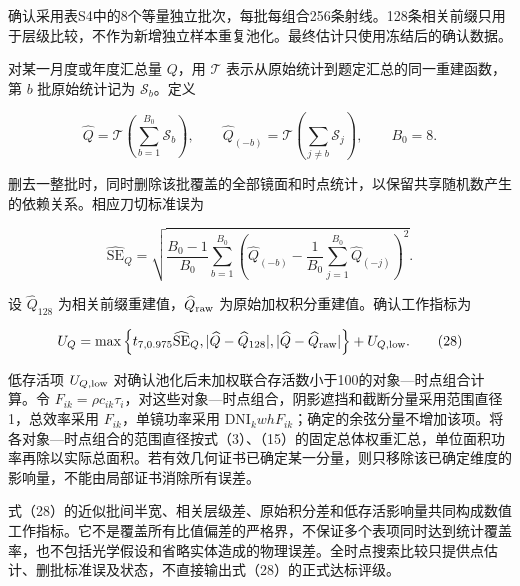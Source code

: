 \documentclass[UTF8,fontset=windows,zihao=-4]{ctexart}
\begin{document}
确认采用表S4中的8个等量独立批次，每批每组合256条射线。128条相关前缀只用于层级比较，不作为新增独立样本重复池化。最终估计只使用冻结后的确认数据。

\par\noindent\begin{minipage}{\linewidth}
对某一月度或年度汇总量 \(Q\)，用 \(\mathcal T\) 表示从原始统计到题定汇总的同一重建函数，第 \(b\) 批原始统计记为 \(\mathcal S_b\)。定义

\[
\widehat Q=\mathcal T\!\left(\sum_{b=1}^{B_0}\mathcal S_b\right),
\qquad
\widehat Q_{(-b)}=\mathcal T\!\left(\sum_{j\ne b}\mathcal S_j\right),
\qquad B_0=8.
\tag{26}
\]
\end{minipage}\par

\par\noindent\begin{minipage}{\linewidth}
删去一整批时，同时删除该批覆盖的全部镜面和时点统计，以保留共享随机数产生的依赖关系。相应刀切标准误为

\[
\widehat{\mathrm{SE}}_Q=
\sqrt{\frac{B_0-1}{B_0}\sum_{b=1}^{B_0}
\left(\widehat Q_{(-b)}-\frac1{B_0}\sum_{j=1}^{B_0}\widehat Q_{(-j)}\right)^2}.
\tag{27}
\]
\end{minipage}\par

\par\noindent\begin{minipage}{\linewidth}
设 \(\widehat Q_{128}\) 为相关前缀重建值，\(\widehat Q_{\rm raw}\) 为原始加权积分重建值。确认工作指标为

\[
U_Q=
\max\left\{
t_{7,0.975}\widehat{\mathrm{SE}}_Q,
|\widehat Q-\widehat Q_{128}|,
|\widehat Q-\widehat Q_{\rm raw}|
\right\}+U_{Q,\rm low}.
\tag{28}
\]
\end{minipage}\par

低存活项 \(U_{Q,\rm low}\) 对确认池化后未加权联合存活数小于100的对象—时点组合计算。令 \(F_{ik}=\rho c_{ik}\tau_i\)，对这些对象—时点组合，阴影遮挡和截断分量采用范围直径1，总效率采用 \(F_{ik}\)，单镜功率采用 \(\mathrm{DNI}_kwhF_{ik}\)；确定的余弦分量不增加该项。将各对象—时点组合的范围直径按式（3）、（15）的固定总体权重汇总，单位面积功率再除以实际总面积。若有效几何证书已确定某一分量，则只移除该已确定维度的影响量，不能由局部证书消除所有误差。

式（28）的近似批间半宽、相关层级差、原始积分差和低存活影响量共同构成数值工作指标。它不是覆盖所有比值偏差的严格界，不保证多个表项同时达到统计覆盖率，也不包括光学假设和省略实体造成的物理误差。全时点搜索比较只提供点估计、删批标准误及状态，不直接输出式（28）的正式达标评级。
\end{document}
